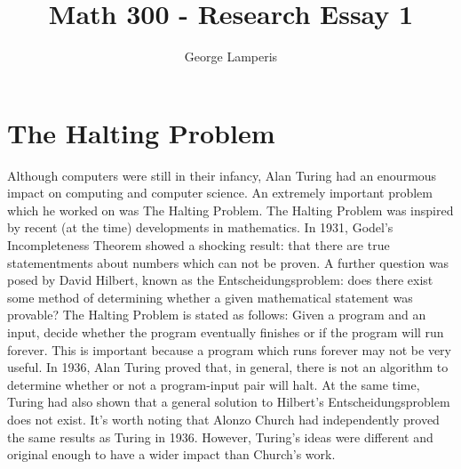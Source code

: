 \documentclass[12pt]{article}
\title{Math 300 - Research Essay 1}
\author{George Lamperis}
\date{}
\theoremstyle{mystyle}
\begin{document}
\maketitle



\section{The Halting Problem}

Although computers were still in their infancy, Alan Turing had an enourmous
impact on computing and computer science. An extremely important problem which
he worked on was The Halting Problem. 
The Halting Problem was inspired by recent (at the time) developments in
mathematics. In 1931, Godel's Incompleteness Theorem showed a shocking result:
that there are true statementments about numbers which can not be proven.
A further question was posed by David Hilbert, known as the
Entscheidungsproblem: does there exist some method of determining whether a 
given mathematical statement was provable?
The Halting Problem is stated as follows: Given a program and an input, decide
whether the program eventually finishes or if the program will run forever. This
is important because a program which runs forever may not be very useful. In
1936, Alan Turing proved that, in general, there is not an algorithm to
determine whether or not a program-input pair will halt. At the same time,
Turing had also shown that a general solution to Hilbert's Entscheidungsproblem
does not exist. It's worth noting that Alonzo Church had independently proved
the same results as Turing in 1936. However, Turing's ideas were different and
original enough to have a wider impact than Church's work.
\end{document}
